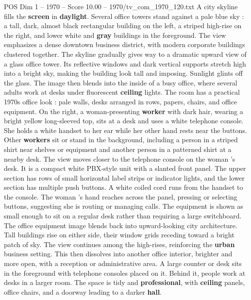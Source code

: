 \begin{textsample}{POS Dim 1 – 1970 – Score 10.00 – 1970/tv\_com\_1970\_120.txt}  \label{ex:f1_pos_062}
A city skyline fills the \textbf{screen} in \textbf{daylight}.
Several office towers stand against a pale blue sky : a tall, dark, almost black rectangular building on the left, a striped high-rise on the right, and lower white and \textbf{gray} buildings in the foreground.
The view emphasizes a dense downtown business district, with modern corporate buildings clustered together.
The skyline gradually gives way to a dramatic upward view of a glass office tower.
Its reflective windows and dark vertical supports stretch high into a bright sky, making the building look tall and imposing.
Sunlight glints off the glass.
The image then blends into the inside of a busy office, where several adults work at desks under fluorescent \textbf{ceiling} lights.
The room has a practical 1970s office look : pale walls, desks arranged in rows, papers, chairs, and office equipment.
On the right, a woman-presenting \textbf{worker} with dark hair, wearing a bright yellow long-sleeved top, sits at a desk and uses a white telephone console.
She holds a white handset to her ear while her other hand rests near the buttons.
Other \textbf{workers} sit or stand in the background, including a person in a striped shirt near shelves or equipment and another person in a patterned shirt at a nearby desk.
The view moves closer to the telephone console on the woman ’s desk.
It is a compact white PBX-style unit with a slanted front panel.
The upper section has rows of small horizontal label strips or indicator lights, and the lower section has multiple push buttons.
A white coiled cord runs from the handset to the console.
The woman ’s hand reaches across the panel, pressing or selecting buttons, suggesting she is routing or managing calls.
The equipment is shown as small enough to sit on a regular desk rather than requiring a large switchboard.
The office equipment image blends back into upward-looking city architecture.
Tall buildings rise on either side, their window grids receding toward a bright patch of sky.
The view continues among the high-rises, reinforcing the \textbf{urban} business setting.
This then dissolves into another office interior, brighter and more open, with a reception or administrative area.
A large counter or desk sits in the foreground with telephone consoles placed on it.
Behind it, people work at desks in a larger room.
The space is tidy and \textbf{professional}, with \textbf{ceiling} panels, office chairs, and a doorway leading to a darker \textbf{hall}.

\end{textsample}

